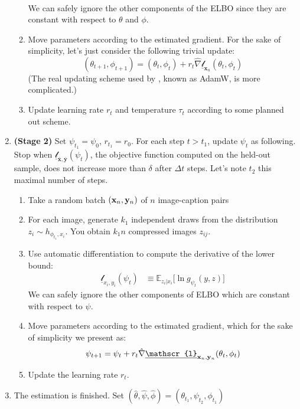 \documentclass{article}
\begin{document}
\begin{appendix}
\begin{multicols}{2}
\begin{enumerate}
\begin{enumerate}
\begin{align*}
    \end{align*}
    We can safely ignore the other components of the ELBO since they are constant with respect to $\theta$ and $\phi$.
    \item Move parameters according to the estimated gradient. For the sake of simplicity, let's just consider the following trivial update: $$(\theta_{t+1},\phi_{t+1})=(\theta_{t},\phi_{t})+r_t\hat{\nabla}\underline{\mathscr{l}}_{\mathbf{x}_n}(\theta_{t},\phi_{t})$$
    (The real updating scheme used by \citeauthor{zeroshot}, known as AdamW, is more complicated.)
    \item Update learning rate $r_t$ and temperature $\tau_t$ according to some planned out scheme.
    \end{enumerate}
    
    \item \textbf{(Stage 2)} Set $\psi_{t_1}=\psi_0$, $r_{t_1}=r_0$. For each step $t>t_{1}$, update $\psi_t$ as following. Stop when $\underline{\mathscr{l}}_{\bar{\mathbf{x}},\bar{\mathbf{y}}}(\psi_t)$, the objective function computed on the held-out sample, does not increase more than $\delta$ after $\Delta t$ steps.  Let's note $t_2$ this maximal number of steps.
    
    \begin{enumerate}
    \item Take a random batch $(\mathbf{x}_n,\mathbf{y}_n)$ of $n$ image-caption pairs
    \item For each image, generate $k_1$ independent draws from the distribution $z_i\sim h_{\phi_{t_1},x_i}$. You obtain $k_1n$ compressed images $z_{ij}$.
    \item Use automatic differentiation to compute the derivative of the lower bound: \begin{align*}
    \underline{\mathscr{l}}_{x_i,y_i}(\psi_t) & \equiv \mathbb{E}_{z_i|x_i} \Big[\ln g_{\psi_t}(y,z)\Big]
    \end{align*}
    We can safely ignore the other components of ELBO which are constant with respect to $\psi$.
    \item Move parameters according to the estimated gradient, which for the sake of simplicity we present as: $$\psi_{t+1}=\psi_{t}+r_t\hat{\nabla}\underline{\mathscr{l}}_{\xn,\yn}(\theta_{t},\phi_{t})$$
    \item Update the learning rate $r_t$.
    \end{enumerate}
    \item The estimation is finished. Set $(\hat \theta, \hat \psi, \hat \phi)=(\theta_{t_1}, \psi_{t_2}, \phi_{t_1})$
\end{enumerate}


\end{multicols}
\end{appendix}
\end{document}
